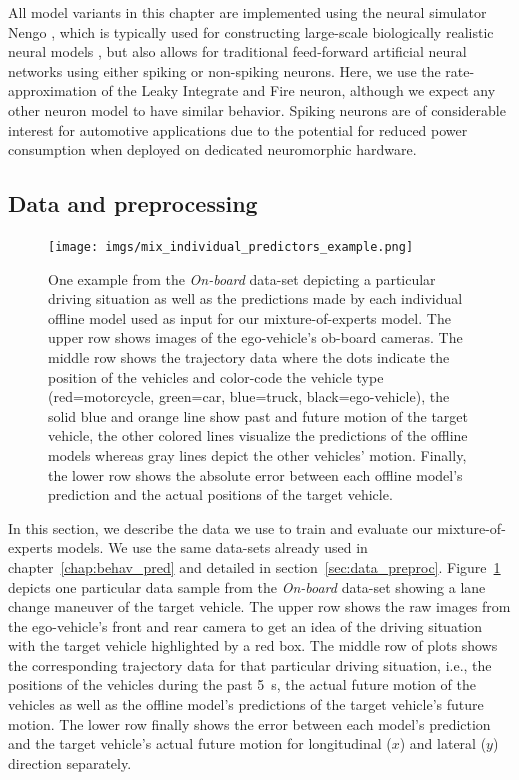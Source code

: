 All model variants in this chapter are implemented using the neural simulator Nengo \cite{Bekolay2014}, which is typically used for constructing large-scale biologically realistic neural models \cite{Eliasmith2013}, but also allows for traditional feed-forward artificial neural networks using either spiking or non-spiking neurons.
Here, we use the rate-approximation of the Leaky Integrate and Fire neuron, although we expect any other neuron model to have similar behavior.
Spiking neurons are of considerable interest for automotive applications due to the potential for reduced power consumption when deployed on dedicated neuromorphic hardware. 


\subsection{Data and preprocessing}%
\label{subsec:data_and_preprocessing}
\begin{figure}[th!]
    \centering
    \texttt{[image: imgs/mix\_individual\_predictors\_example.png]}
    \caption{One example from the \emph{On-board} data-set depicting a particular driving situation as well as the predictions made by each individual offline model used as input for our mixture-of-experts model.
        The upper row shows images of the ego-vehicle's ob-board cameras.
        The middle row shows the trajectory data where the dots indicate the position of the vehicles and color-code the vehicle type (red=motorcycle, green=car, blue=truck, black=ego-vehicle), the solid blue and orange line show past and future motion of the target vehicle, the other colored lines visualize the predictions of the offline models whereas gray lines depict the other vehicles' motion.
        Finally, the lower row shows the absolute error between each offline model's prediction and the actual positions of the target vehicle.
    }
    \label{fig:mix_individual_predictors_example}
\end{figure}

In this section, we describe the data we use to train and evaluate our mixture-of-experts models.
We use the same data-sets already used in chapter~\ref{chap:behav_pred} and detailed in section~\ref{sec:data_preproc}.
Figure~\ref{fig:mix_individual_predictors_example} depicts one particular data sample from the \emph{On-board} data-set showing a lane change maneuver of the target vehicle.
The upper row shows the raw images from the ego-vehicle's front and rear camera to get an idea of the driving situation with the target vehicle highlighted by a red box.
The middle row of plots shows the corresponding trajectory data for that particular driving situation, i.e., the positions of the vehicles during the past \SI{5}{\second}, the actual future motion of the vehicles as well as the offline model's predictions of the target vehicle's future motion.
The lower row finally shows the error between each model's prediction and the target vehicle's actual future motion for longitudinal ($x$) and lateral ($y$) direction separately.

